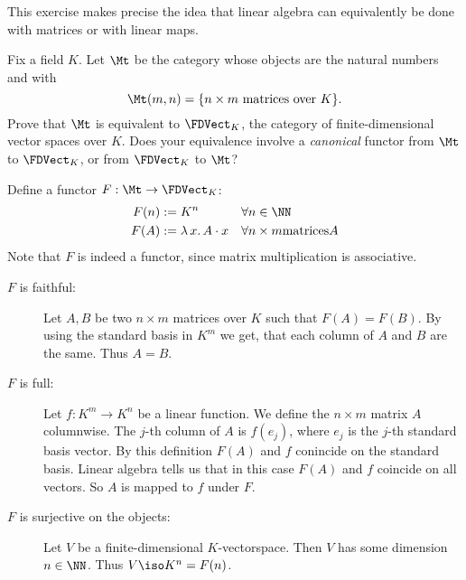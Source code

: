\begin{exercise}
This exercise makes precise the idea that linear algebra can equivalently
be done with matrices or with linear maps.

Fix a field $K$.  Let $\Mt$ be the category whose objects are the natural
numbers and with
\[ \Mt(m, n) = \{ n \times m \text{ matrices over } K \}. \]
Prove that $\Mt$ is equivalent to $\FDVect_K$, the category of
finite-dimensional vector spaces over $K$.
Does your equivalence involve a \emph{canonical} functor from $\Mt$ to $\FDVect_K$, or from $\FDVect_K$ to $\Mt$?
\end{exercise}
\begin{answer}
    Define a functor $F: \Mt \to \FDVect_K$:
    \begin{align*}
        F(n) & := K^n && \forall n \in \NN\\
        F(A) & := \lambda\, x. \, A \cdot x && \forall n \times m \text{matrices} A
    \end{align*}
    Note that $F$ is indeed a functor, since matrix multiplication is associative.
    \begin{description}
        \item[$F$ is faithful:]
            Let $A, B$ be two $n \times m$ matrices over $K$ such that $F(A) = F(B)$.
            By using the standard basis in $K^m$ we get, that each column of $A$ and $B$ are the same.
            Thus $A = B$.
        \item[$F$ is full:]
            Let $f: K^m \to K^n$ be a linear function.
            We define the $n \times m$ matrix $A$ columnwise.
            The $j$-th column of $A$ is $f(e_j)$, where $e_j$ is the $j$-th standard basis vector.
            By this definition $F(A)$ and $f$ conincide on the standard basis.
            Linear algebra tells us that in this case $F(A)$ and $f$ coincide on all vectors.
            So $A$ is mapped to $f$ under $F$.
        \item[$F$ is surjective on the objects:]
            Let $V$ be a finite-dimensional $K$-vectorspace.
            Then $V$ has some dimension $n \in \NN$.
            Thus $V \iso K^n = F(n)$.
    \end{description}
\end{answer}



